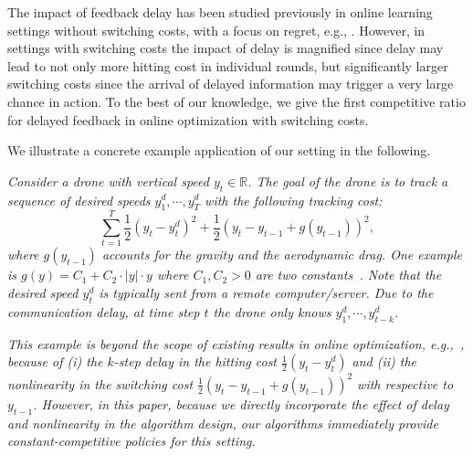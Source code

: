 The impact of feedback delay has been studied previously in online learning settings without switching costs, with a focus on regret, e.g., \citep{joulani2013online,shamir2017online}.  However, in settings with switching costs the impact of delay is magnified since delay may lead to not only more hitting cost in individual rounds, but significantly larger switching costs since the arrival of delayed information may trigger a very large chance in action.  To the best of our knowledge, we give the first competitive ratio for delayed feedback in online optimization with switching costs. 

We illustrate a concrete example application of our setting in the following.

\begin{example}
\label{example:drone} \emph{
Consider a drone with vertical speed $y_t\in\mathbb{R}$. The goal of the drone is to track a sequence of desired speeds $y^d_1,\cdots,y^d_T$ with the following tracking cost:}
\begin{equation}
    \sum_{t=1}^T \frac{1}{2}(y_t-y^d_t)^2 + \frac{1}{2}(y_t-y_{t-1}+g(y_{t-1}))^2,
\end{equation}
\emph{where $g(y_{t-1})$ accounts for the gravity and the aerodynamic drag. One example is $g(y)=C_1+C_2\cdot|y|\cdot y$ where $C_1,C_2>0$ are two constants~\cite{shi2019neural}. Note that the desired speed $y_t^d$ is typically sent from a remote computer/server. Due to the communication delay, at time step $t$ the drone only knows $y_1^d,\cdots,y_{t-k}^d$.}

\emph{This example is beyond the scope of existing results in online optimization, e.g.,~\cite{shi2020online,goel2019beyond,goel2019online}, because of (i) the $k$-step delay in the hitting cost $\frac{1}{2}(y_t-y_t^d)$ and (ii) the nonlinearity in the switching cost $\frac{1}{2}(y_t-y_{t-1}+g(y_{t-1}))^2$ with respective to $y_{t-1}$. However, in this paper, because we directly incorporate the effect of delay and nonlinearity in the algorithm design, our algorithms immediately provide constant-competitive policies for this setting.}
\end{example}


